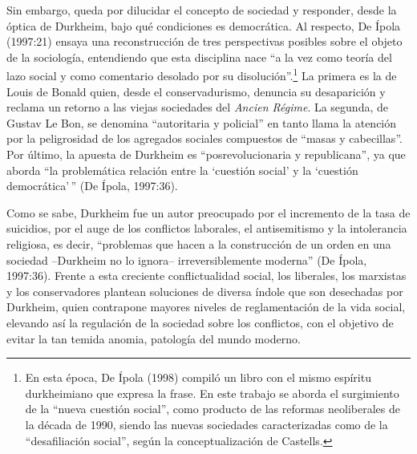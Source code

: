 Sin embargo, queda por dilucidar el concepto de sociedad y responder, desde la óptica de Durkheim, bajo qué condiciones es democrática. Al respecto, De Ípola (1997:21) ensaya una reconstrucción de tres perspectivas posibles sobre el objeto de la sociología, entendiendo que esta disciplina nace ``a la vez como teoría del lazo social y como comentario desolado por su disolución''.\footnote{En esta época, De Ípola (1998) compiló un libro con el mismo espíritu durkheimiano que expresa la frase. En este trabajo se aborda el surgimiento de la ``nueva cuestión social'', como producto de las reformas neoliberales de la década de 1990, siendo las nuevas sociedades caracterizadas como de la ``desafiliación social'', según la conceptualización de Castells.} La primera es la de Louis de Bonald quien, desde el conservadurismo, denuncia su desaparición y reclama un retorno a las viejas sociedades del \emph{Ancien Régime}. La segunda, de Gustav Le Bon, se denomina ``autoritaria y policial'' en tanto llama la atención por la peligrosidad de los agregados sociales compuestos de ``masas y cabecillas''. Por último, la apuesta de Durkheim es ``posrevolucionaria y republicana'', ya que aborda ``la problemática relación entre la `cuestión social' y la `cuestión democrática'\,'' (De Ípola, 1997:36).

Como se sabe, Durkheim fue un autor preocupado por el incremento de la tasa de suicidios, por el auge de los conflictos laborales, el antisemitismo y la intolerancia religiosa, es decir, ``problemas que hacen a la construcción de un orden en una sociedad --Durkheim no lo ignora-- irreversiblemente moderna'' (De Ípola, 1997:36). Frente a esta creciente conflictualidad social, los liberales, los marxistas y los conservadores plantean soluciones de diversa índole que son desechadas por Durkheim, quien contrapone mayores niveles de reglamentación de la vida social, elevando así la regulación de la sociedad sobre los conflictos, con el objetivo de evitar la tan temida anomia, patología del mundo moderno.

